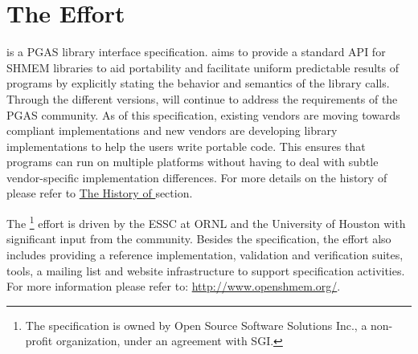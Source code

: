 \section{The \openshmem Effort}

\openshmem is a \ac{PGAS} library interface specification. \openshmem aims to provide a standard \ac{API} for SHMEM libraries to aid portability and facilitate uniform predictable results of \openshmem programs by explicitly stating the behavior and semantics of the \openshmem library calls. Through the different versions, \openshmem will continue to address the requirements of the \ac{PGAS} community. 
As of this specification, existing vendors are moving towards \openshmem compliant implementations and new vendors are developing \openshmem library implementations to help the users write portable \openshmem code. This ensures that programs can run on multiple platforms without having to deal with subtle vendor-specific implementation differences. For more details on the history of 
\openshmem please refer to \hyperref[sec:openshmem_history]{The History of \openshmem} section.  

The \openshmem\footnote{The \openshmem specification is owned by Open Source Software Solutions Inc., a non-profit organization, under an agreement with SGI.}  effort is driven by the \ac{ESSC} at \ac{ORNL} and the University of Houston with significant input from the \openshmem{} community. Besides the specification, the effort also includes providing a reference \openshmem implementation, validation and verification suites, tools, a mailing list and website infrastructure to support specification activities. For more information please refer to: \url{http://www.openshmem.org/}.
